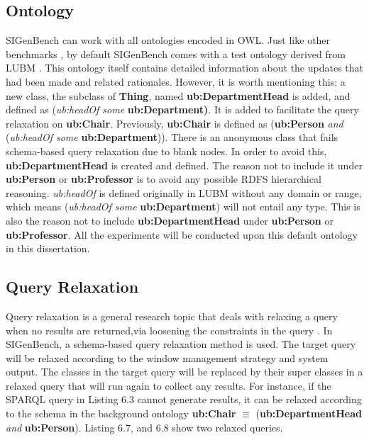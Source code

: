\subsection{Ontology}
SIGenBench can work with all ontologies encoded in OWL.
Just like other benchmarks \cite{dell2013correctness} \cite{ali2015citybench}, by default SIGenBench comes with a test ontology derived from LUBM \cite{guo2005lubm}.
This ontology itself contains detailed information about the updates that had been made and related rationales. 
However, it is worth mentioning this: a new class, the subclass of \textbf{Thing}, named \textbf{ub:DepartmentHead} is added, and defined as (\textit{ub:headOf some} \textbf{ub:Department)}. 
It is added to facilitate the query relaxation on \textbf{ub:Chair}. 
Previously, \textbf{ub:Chair} is defined as (\textbf{ub:Person} \textit{and} (\textit{ub:headOf some} \textbf{ub:Department})). 
There is an anonymous class that fails schema-based query relaxation due to blank nodes. 
In order to avoid this, \textbf{ub:DepartmentHead} is created and defined.
The reason not to include it under \textbf{ub:Person} or \textbf{ub:Professor} is to avoid any possible RDFS hierarchical reasoning. 
\textit{ub:headOf} is defined originally in LUBM without any domain or range, which means (\textit{ub:headOf some} \textbf{ub:Department}) will not entail any type.
This is also the reason not to include \textbf{ub:DepartmentHead} under \textbf{ub:Person} or \textbf{ub:Professor}.
All the experiments will be conducted upon this default ontology in this dissertation.
%
\subsection{Query Relaxation}
Query relaxation is a general research topic that deals with relaxing a query when no results are returned,via loosening the constraints in the query \cite{hurtado2008query} \cite{reddy2010efficient} \cite{viswanathan2016pragmatic}.
In SIGenBench, a schema-based query relaxation method is used.
The target query will be relaxed according to the window management strategy and system output.
The classes in the target query will be replaced by their super classes in a relaxed query that will run again to collect any results. 
For instance, if the SPARQL query in Listing 6.3 cannot generate results, it can be relaxed according to the schema in the background ontology \textbf{ub:Chair} $\equiv$ (\textbf{ub:DepartmentHead} \textit{and} \textbf{ub:Person}).
Listing 6.7, and 6.8 show two relaxed queries.

